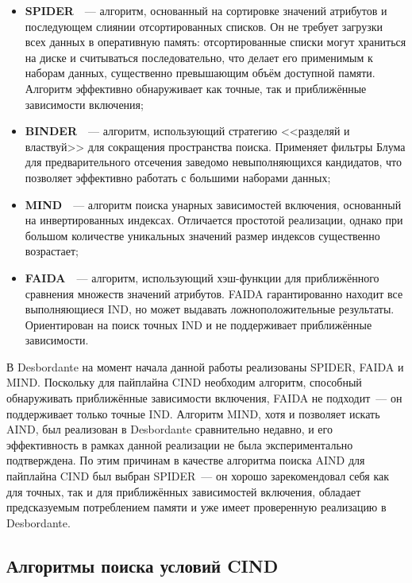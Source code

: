 \begin{itemize}
    \item \textbf{SPIDER}~\cite{bauckmann2006efficiently}~--- алгоритм, основанный на сортировке значений атрибутов и последующем слиянии отсортированных списков. Он не требует загрузки всех данных в оперативную память: отсортированные списки могут храниться на диске и считываться последовательно, что делает его применимым к наборам данных, существенно превышающим объём доступной памяти. Алгоритм эффективно обнаруживает как точные, так и приближённые зависимости включения;

    \item \textbf{BINDER}~\cite{papenbrock2015divide}~--- алгоритм, использующий стратегию <<разделяй и властвуй>> для сокращения пространства поиска. Применяет фильтры Блума для предварительного отсечения заведомо невыполняющихся кандидатов, что позволяет эффективно работать с большими наборами данных;

    \item \textbf{MIND}~\cite{de2002unary}~--- алгоритм поиска унарных зависимостей включения, основанный на инвертированных индексах. Отличается простотой реализации, однако при большом количестве уникальных значений размер индексов существенно возрастает;

    \item \textbf{FAIDA}~\cite{kruse2018fast}~--- алгоритм, использующий хэш-функции для приближённого сравнения множеств значений атрибутов. FAIDA гарантированно находит все выполняющиеся IND, но может выдавать ложноположительные результаты. Ориентирован на поиск точных IND и не поддерживает приближённые зависимости.
\end{itemize}

В Desbordante на момент начала данной работы реализованы SPIDER, FAIDA и MIND. Поскольку для пайплайна CIND необходим алгоритм, способный обнаруживать приближённые зависимости включения, FAIDA не подходит~--- он поддерживает только точные IND. Алгоритм MIND, хотя и позволяет искать AIND, был реализован в Desbordante сравнительно недавно, и его эффективность в рамках данной реализации не была экспериментально подтверждена. По этим причинам в качестве алгоритма поиска AIND для пайплайна CIND был выбран SPIDER~--- он хорошо зарекомендовал себя как для точных, так и для приближённых зависимостей включения, обладает предсказуемым потреблением памяти и уже имеет проверенную реализацию в Desbordante.

\subsection{Алгоритмы поиска условий CIND}

